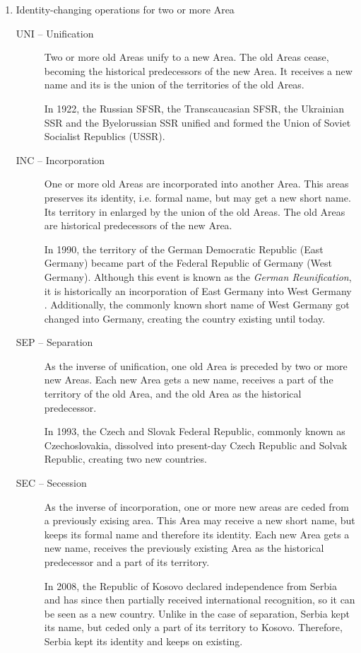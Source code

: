 \begin{enumerate}
  \item Identity-changing operations for two or more Area
  \begin{description}
    \item[UNI -- Unification]
    Two or more old Areas unify to a new Area. The old Areas cease, becoming the historical predecessors of the new Area. It receives a new name and its is the union of the territories of the old Areas. \\
    \begin{footnotesize}
      In 1922, the Russian SFSR, the Transcaucasian SFSR, the Ukrainian SSR and the Byelorussian SSR unified and formed the Union of Soviet Socialist Republics (USSR).
    \end{footnotesize}
    \item[INC -- Incorporation]
    One or more old Areas are incorporated into another Area. This areas preserves its identity, i.e. formal name, but may get a new short name. Its territory in enlarged by the union of the old Areas. The old Areas are historical predecessors of the new Area. \\
    \begin{footnotesize}
      In 1990, the territory of the German Democratic Republic (East Germany) became part of the Federal Republic of Germany (West Germany). Although this event is known as the \emph{German Reunification}, it is historically an incorporation of East Germany into West Germany \cite{incorporationEastWestGermany}. Additionally, the commonly known short name of West Germany got changed into Germany, creating the country existing until today.
    \end{footnotesize}
    \item[SEP -- Separation]
    As the inverse of unification, one old Area is preceded by two or more new Areas. Each new Area gets a new name, receives a part of the territory of the old Area, and the old Area as the historical predecessor. \\
    \begin{footnotesize}
      In 1993, the Czech and Slovak Federal Republic, commonly known as Czechoslovakia, dissolved into present-day Czech Republic and Solvak Republic, creating two new countries.
    \end{footnotesize}
    \item[SEC -- Secession]
    As the inverse of incorporation, one or more new areas are ceded from a previously exising area. This Area may receive a new short name, but keeps its formal name and therefore its identity. Each new Area gets a new name, receives the previously existing Area as the historical predecessor and a part of its territory. \\
    \begin{footnotesize}
      In 2008, the Republic of Kosovo declared independence from Serbia and has since then partially received international recognition, so it can be seen as a new country. Unlike in the case of separation, Serbia kept its name, but ceded only a part of its territory to Kosovo. Therefore, Serbia kept its identity and keeps on existing.
    \end{footnotesize}
  \end{description}


\end{enumerate}
